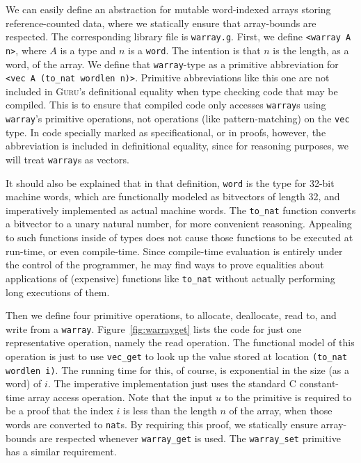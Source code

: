 \documentclass[9pt,natbib]{sigplanconf}
\begin{document}
We can easily define an abstraction for mutable word-indexed arrays
storing reference-counted data, where we statically ensure that
array-bounds are respected.  The corresponding library file is
\texttt{warray.g}.  First, we define \texttt{<warray A n>}, where $A$
is a type and $n$ is a \texttt{word}.  The intention is that $n$ is
the length, as a word, of the array.  We define that
\texttt{warray}-type as a primitive abbreviation for \texttt{<vec A
  (to\_nat wordlen n)>}.  Primitive abbreviations like this one are
not included in \textsc{Guru}'s definitional equality when type
checking code that may be compiled.  This is to ensure that compiled
code only accesses \texttt{warray}s using \texttt{warray}'s primitive
operations, not operations (like pattern-matching) on the \texttt{vec}
type.  In code specially marked as specificational, or in proofs,
however, the abbreviation is included in definitional equality, since
for reasoning purposes, we will treat \texttt{warray}s as vectors.

It should also be explained that in that definition, \texttt{word} is
the type for 32-bit machine words, which are functionally modeled as
bitvectors of length 32, and imperatively implemented as actual
machine words.  The \texttt{to\_nat} function converts a bitvector to
a unary natural number, for more convenient reasoning.  Appealing to
such functions inside of types does not cause those functions to be
executed at run-time, or even compile-time.  Since compile-time
evaluation is entirely under the control of the programmer, he may
find ways to prove equalities about applications of (expensive)
functions like \texttt{to\_nat} without actually performing long
executions of them.

Then we define four primitive operations, to allocate, deallocate,
read to, and write from a \texttt{warray}.  Figure~\ref{fig:warrayget}
lists the code for just one representative operation, namely the read
operation.  The functional model of this operation is just to use
\texttt{vec\_get} to look up the value stored at location
\texttt{(to\_nat wordlen i)}.  The running time for this, of course,
is exponential in the size (as a word) of $i$.  The imperative
implementation just uses the standard C constant-time array access
operation.  Note that the input $u$ to the primitive is required to be
a proof that the index $i$ is less than the length $n$ of the array,
when those words are converted to \texttt{nat}s.  By requiring this
proof, we statically ensure array-bounds are respected whenever
\texttt{warray\_get} is used.  The \texttt{warray\_set} primitive has
a similar requirement.  
\end{document}
